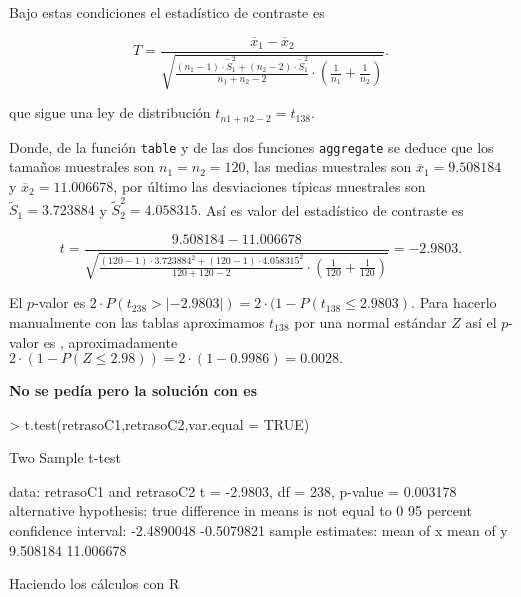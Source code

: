 \documentclass[10pt]{article}
\renewcommand{\leq}{\leqslant}
\begin{document}
{Bajo estas condiciones el estadístico de contraste es

$$T=\frac{\overline{x}_1-\overline{x}_2}{\sqrt{\frac{(n_1-1)\cdot \tilde{S}_1^2+(n_2-2)\cdot \tilde{S}_1^2}{n_1+n_2-2}\cdot 
\left(\frac{1}{n_1}+\frac{1}{n_2}\right)}}.$$

que sigue una ley de distribución $t_{n1+n2-2}=t_{138}.$

Donde, de la función \texttt{table} y de las dos funciones \texttt{aggregate} se deduce   que los tamaños muestrales son 
$n_1=n_2=120$, las medias muestrales son $\overline{x}_1=9.508184$ y $\overline{x}_2=11.006678$, por último las desviaciones típicas muestrales son $\tilde{S}_1=3.723884$ y   $\tilde{S}_2^2=4.058315.$ Así es valor del estadístico de contraste es

$$t=\frac{9.508184-11.006678}{\sqrt{\frac{(120-1)\cdot 3.723884^2+(120-1)\cdot 4.058315^2}{120+120-2} \cdot \left(\frac{1}{120}+\frac{1}{120}\right)}}=-2.9803.$$




El $p$-valor es $2\cdot P(t_{238}>|-2.9803|)=2\cdot (1-P(t_138\leq2.9803).$ Para hacerlo manualmente con las tablas aproximamos $t_{138}$ por una normal estándar $Z$ así el $p$-valor es , aproximadamente $2\cdot (1-P(Z\leq2.98))=2\cdot (1-0.9986)=0.0028.$


\textbf{No se pedía pero la solución con es}


\begin{Schunk}
\begin{Sinput}
> t.test(retrasoC1,retrasoC2,var.equal = TRUE)
\end{Sinput}
\begin{Soutput}
	Two Sample t-test

data:  retrasoC1 and retrasoC2
t = -2.9803, df = 238, p-value = 0.003178
alternative hypothesis: true difference in means is not equal to 0
95 percent confidence interval:
 -2.4890048 -0.5079821
sample estimates:
mean of x mean of y 
 9.508184 11.006678 
\end{Soutput}
\end{Schunk}

Haciendo los cálculos con R

}
\end{document}
